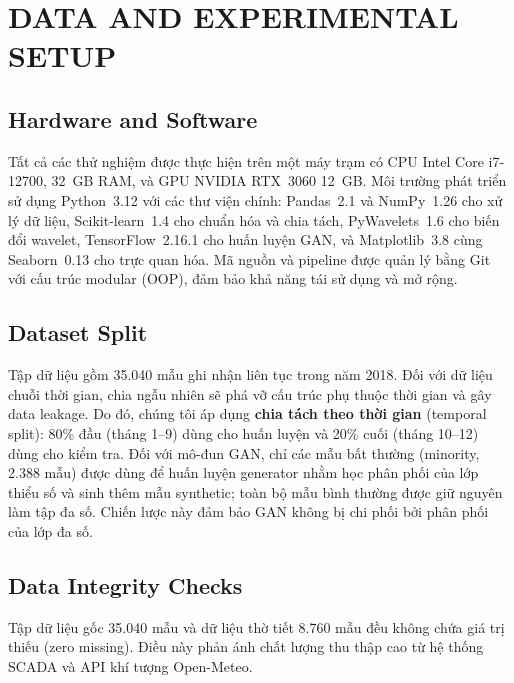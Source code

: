 \documentclass[conference]{IEEEtran}
\begin{document}

\section{DATA AND EXPERIMENTAL SETUP}
\label{sec:experimental}

\subsection{Hardware and Software}

Tất cả các thử nghiệm được thực hiện trên một máy trạm có CPU Intel Core i7-12700, 32~GB RAM, và GPU NVIDIA RTX~3060 12~GB.
Môi trường phát triển sử dụng Python~3.12 với các thư viện chính:
Pandas~2.1 và NumPy~1.26 cho xử lý dữ liệu,
Scikit-learn~1.4 cho chuẩn hóa và chia tách,
PyWavelets~1.6 cho biến đổi wavelet,
TensorFlow~2.16.1 cho huấn luyện GAN,
và Matplotlib~3.8 cùng Seaborn~0.13 cho trực quan hóa.
Mã nguồn và pipeline được quản lý bằng Git với cấu trúc modular (OOP),
đảm bảo khả năng tái sử dụng và mở rộng.

\subsection{Dataset Split}

Tập dữ liệu gồm 35.040 mẫu ghi nhận liên tục trong năm 2018.
Đối với dữ liệu chuỗi thời gian, chia ngẫu nhiên sẽ phá vỡ cấu trúc phụ thuộc thời gian và gây data leakage.
Do đó, chúng tôi áp dụng \textbf{chia tách theo thời gian} (temporal split):
80\% đầu (tháng 1--9) dùng cho huấn luyện và 20\% cuối (tháng 10--12) dùng cho kiểm tra.
Đối với mô-đun GAN, chỉ các mẫu bất thường (minority, 2.388 mẫu) được dùng để huấn luyện generator
nhằm học phân phối của lớp thiểu số và sinh thêm mẫu synthetic;
toàn bộ mẫu bình thường được giữ nguyên làm tập đa số.
Chiến lược này đảm bảo GAN không bị chi phối bởi phân phối của lớp đa số.

\subsection{Data Integrity Checks}

Tập dữ liệu gốc 35.040 mẫu và dữ liệu thờ tiết 8.760 mẫu đều không chứa giá trị thiếu (zero missing).
Điều này phản ánh chất lượng thu thập cao từ hệ thống SCADA và API khí tượng Open-Meteo.
\end{document}
